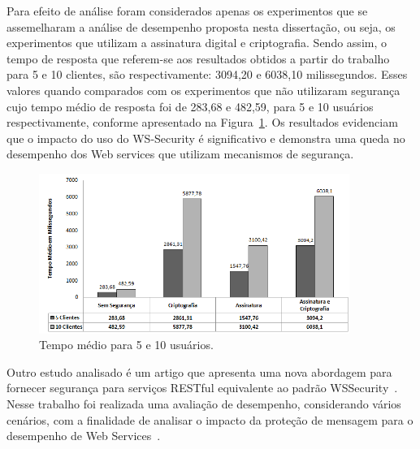 Para efeito de análise foram considerados apenas os experimentos que se assemelharam a análise de desempenho proposta nesta dissertação, ou seja, os experimentos que utilizam a assinatura digital e criptografia.  Sendo assim, o tempo de resposta  que referem-se aos resultados obtidos a partir do trabalho~\cite{rodrigues2011analysis} para  5 e 10 clientes, são respectivamente: 3094,20 e 6038,10 milissegundos. Esses valores quando comparados com os experimentos que não utilizaram segurança cujo tempo médio de resposta foi de 283,68 e  482,59,  para 5 e 10 usuários respectivamente, conforme apresentado na Figura~\ref{fig:comparativowssecurity}. Os resultados  evidenciam que o impacto do uso do WS-Security é significativo e demonstra uma queda no desempenho dos Web services que utilizam mecanismos de segurança.


\begin{figure}[!htb]
    \centering
    \includegraphics[width=0.9\textwidth]{comparativowssecurity.png}
    \caption{Tempo médio para 5 e 10 usuários.}
    \label{fig:comparativowssecurity}
\end{figure}

Outro estudo analisado é um artigo que apresenta uma nova abordagem para fornecer segurança para serviços RESTful equivalente ao padrão WSSecurity~\cite{verstichel}. Nesse trabalho foi realizada uma avaliação de desempenho, considerando vários cenários, com a finalidade de analisar o impacto da proteção de mensagem para o desempenho de Web Services~\cite{verstichel}.

